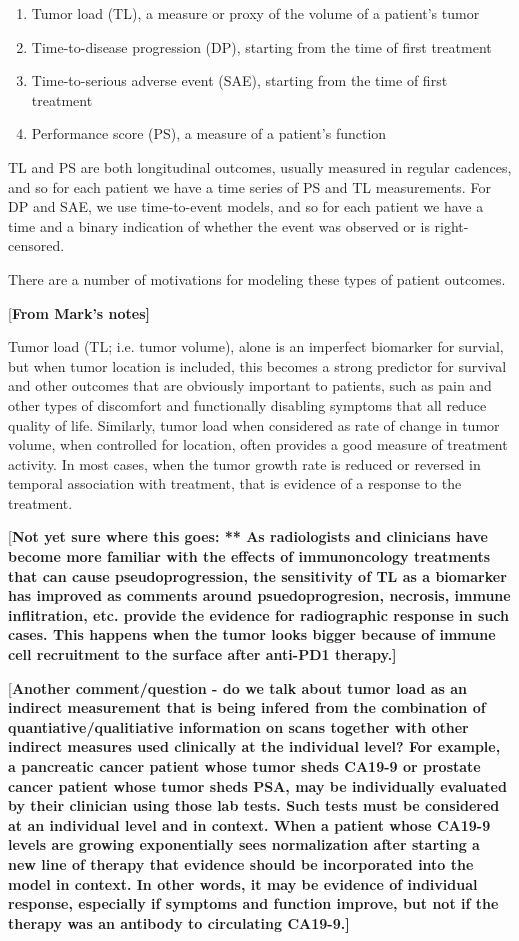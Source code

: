 \documentclass[twocolumn]{bmcart}%
\newcommand{\todo}[1]{{\color{red} [\bf{#1}]}}
\begin{document}
\begin{enumerate}
\item Tumor load (TL), a measure or proxy of the volume of a patient's tumor
\item Time-to-disease progression (DP), starting from the time of first treatment
\item Time-to-serious adverse event (SAE), starting from the time of first treatment
\item Performance score (PS), a measure of a patient's function
\end{enumerate}

TL and PS are both longitudinal outcomes, usually measured in regular cadences,
and so for each patient we have a time series of PS and TL measurements.  For
DP and SAE, we use time-to-event models, and so for each patient we have a time
and a binary indication of whether the event was observed or is right-censored.

There are a number of motivations for modeling these types of patient outcomes.

\todo{From Mark's notes}

Tumor load (TL; i.e. tumor volume), alone is an imperfect biomarker for
survial, but when tumor location is included, this becomes a strong predictor
for survival and other outcomes that are obviously important to patients, such
as pain and other types of discomfort and functionally disabling symptoms that
all reduce quality of life.  Similarly, tumor load when considered as rate of
change in tumor volume, when controlled for location, often provides a good
measure of treatment activity.  In most cases, when the tumor growth rate is
reduced or reversed in temporal association with treatment, that is evidence of
a response to the treatment.

\todo{Not yet sure where this goes: ** As radiologists and clinicians have
  become more familiar with the effects of immunoncology treatments that can
  cause pseudoprogression, the sensitivity of TL as a biomarker has improved as
  comments around psuedoprogresion, necrosis, immune inflitration, etc. provide
  the evidence for radiographic response in such cases.  This happens when the
  tumor looks bigger because of immune cell recruitment to the surface after
  anti-PD1 therapy.}

\todo{Another comment/question - do we talk about tumor load as an indirect
  measurement that is being infered from the combination of
  quantiative/qualitiative information on scans together with other indirect
  measures used clinically at the individual level?  For example, a pancreatic
  cancer patient whose tumor sheds CA19-9 or prostate cancer patient whose
  tumor sheds PSA, may be individually evaluated by their clinician using those
  lab tests.  Such tests must be considered at an individual level and in
  context.  When a patient whose CA19-9 levels are growing exponentially sees
  normalization after starting a new line of therapy that evidence should be
  incorporated into the model in context. In other words, it may be evidence of
  individual response, especially if symptoms and function improve, but not if
  the therapy was an antibody to circulating CA19-9.}
\end{document}
